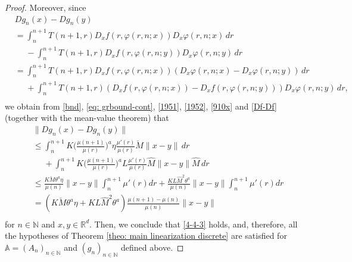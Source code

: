 \documentclass[10pt,a4paper]{amsart}
\def\N{\mathbb{N}}
\def\R{\mathbb{R}}
\renewcommand{\phi}{\varphi}
\begin{document}
\begin{proof}
Moreover, since
\[
\begin{split}
&Dg_{n}(x)-Dg_{n}(y)
\\
&=\int_n^{n+1}T(n+1, r)D_xf(r, \phi(r, n;x))D_x\phi(r, n;x)\, dr \\
&\phantom{=}-\int_n^{n+1}T(n+1, r)D_xf(r, \phi(r, n;y))D_x\phi(r, n;y)\, dr \\
&=\int_n^{n+1}T(n+1, r)D_xf(r, \phi(r, n;x))(D_x\phi(r, n;x)-D_x\phi(r, n;y))\, dr \\
&\phantom{=}+\int_n^{n\!+\!1}T(n+1, r)(D_xf(r, \phi(r, n;x))
\!-\!D_xf(r, \phi(r, n;y)))D_x\phi(r, n;y)\, dr, \\
\end{split}
\]
we obtain from \eqref{bnd}, \eqref{eq: grbound-cont}, \eqref{1951}, \eqref{1952}, \eqref{910x} and \eqref{Df-Df} (together with the mean-value
theorem) that
\[
\begin{split}
&\lVert Dg_{n}(x)-Dg_{n}(y)  \rVert
\\
&\le \int_n^{n+1}K \bigg (\frac{\mu(n+1)}{\mu(r)} \bigg )^a \eta \frac{\mu'(r)}{\mu(r)} \check M\lVert x-y\rVert\, dr \\
&\phantom{\le}+\int_n^{n+1}K \bigg (\frac{\mu(n+1)}{\mu(r)} \bigg )^a L\frac{\mu'(r) }{\mu(r)} \hat M  \lVert x-y\rVert \hat M  \, dr \\
&\le \frac{K\check M \theta^{a}\eta}{\mu(n)} \|x-y\| \int_{n}^{n+1}\mu'(r)dr +\frac{K L \hat M^2 \theta^{a} }{\mu(n)} \|x-y\| \int_{n}^{n+1}\mu'(r)dr\\
&= \left(K\check M \theta^{a}\eta + K L \hat M^2 \theta^{a}\right) \frac{\mu(n+1)-\mu(n)}{\mu(n)} \|x-y\|\\
\end{split}
\]
for $n\in \N$ and $x, y\in \R^d$. Then, we conclude that \eqref{4-4-3} holds, and, therefore, all the hypotheses of Theorem \ref{theo: main linearization discrete} are satisfied for $\mathbb{A}=(A_n)_{n\in \N}$ and $(g_n)_{n\in \N}$ defined above. 


\end{proof}
\end{document}
